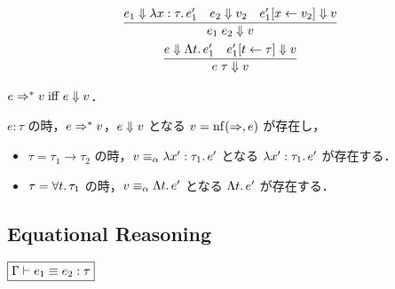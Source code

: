 \begin{gather*}
  \infer{e_1\; e_2 \bigeval v}{
    e_1 \bigeval \lambda x:\tau\ldotp e'_1
    &
    e_2 \bigeval v_2
    &
    e'_1[x \assign v_2] \bigeval v
  }
  \\
  \infer{e\; \tau \bigeval v}{
    e \bigeval \Lambda t\ldotp e'_1
    &
    e'_1[t \assign \tau] \bigeval v
  }
\end{gather*}

\begin{theorem}
  $e \Rightarrow^* v \mathrel{\mathrm{iff}} e \Downarrow v$．
\end{theorem}

\begin{theorem}
  $e: \tau$ の時，$e \Rightarrow^* v$，$e \Downarrow v$ となる $v = \mathop{\mathrm{nf}}(\Rightarrow, e)$ が存在し，
  \begin{itemize}
    \item $\tau = \tau_1 \to \tau_2$ の時，$v \equiv_\alpha \lambda x':\tau_1\ldotp e'$ となる $\lambda x':\tau_1\ldotp e'$ が存在する．
    \item $\tau = \forall t\ldotp \tau_1$ の時，$v \equiv_\alpha \Lambda t\ldotp e'$ となる $\Lambda t\ldotp e'$ が存在する．
  \end{itemize}
\end{theorem}

\subsection{Equational Reasoning}

$\fbox{$\Gamma \vdash e_1 \equiv e_2: \tau$}$

